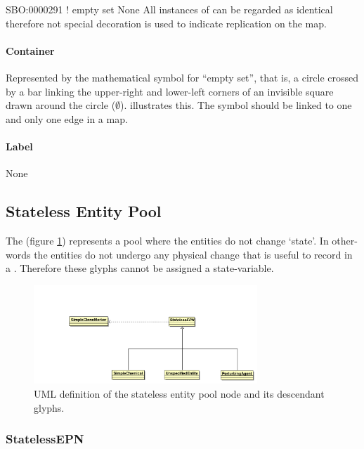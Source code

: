 \begin{glyphDescription}
\glyphSboTerm SBO:0000291 ! empty set
\glyphAux None
\glyphRules
\glyphCloning All instances of  can be regarded as identical
therefore not special decoration is used to indicate replication on the map.
\end{glyphDescription}

\paragraph{Container}

Represented by the mathematical symbol for ``empty
set'', that is, a circle crossed by a bar linking the upper-right and
lower-left corners of an invisible square drawn around the circle ($\emptyset$).
 illustrates this.  The symbol should be linked to one
and only one edge in a map.

\paragraph{Label}

None

\subsection{Stateless Entity Pool}

The  (figure \ref{fig:statelessepnuml})
represents a pool where the entities do not change `state'. In
other-words the entities do not undergo any physical change that is
useful to record in a \PDm. Therefore these glyphs cannot be assigned
a state-variable.

\begin{figure}[htb]
  \centering
  \includegraphics[width=0.75\textwidth]{images/statelessepnuml}
\caption{UML definition of the stateless entity pool node and its descendant glyphs.}
  \label{fig:statelessepnuml}
\end{figure}

\subsubsection{StatelessEPN}

